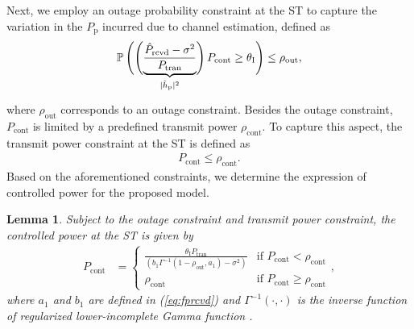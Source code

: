 \documentclass[letterpaper, twocolumn]{IEEEtran}
\newcommand{\p}{\mathbb P}
\newcommand{\sub}[1]{_{\text{#1}}}
\newcommand{\opc}{\rho\sub{out}}
\newcommand{\pc}{\rho\sub{cont}}
\newcommand{\preg}{P\sub{cont}}
\newcommand{\prcvd}{P\sub{rcvd}}
\newcommand{\eprcvd}{\hat{P}\sub{rcvd}}
\newcommand{\ptran}{P\sub{tran}}
\newcommand{\pp}{P\sub{p}}
\newcommand{\ite}{\theta\sub{I}}
\newcommand{\rs}{R\sub{s}}
\newcommand{\gp}{h\sub{p}}
\newcommand{\epgp}{|\hat{h}\sub{p}|^2}
\newcommand{\gs}{h\sub{s}}
\newcommand{\nps}{\sigma^2}
\newtheorem{lemma}{Lemma}
\begin{document}
Next, we employ an outage probability constraint at the ST to capture the variation in the $\pp$ incurred due to channel estimation, defined as 
\begin{align}
\p\left( \left( \smash[b]{\underbrace{\frac{\eprcvd - \nps}{\ptran}}_{\epgp}} \right) \preg \ge \ite \right) \le \opc, \label{eq:opc} \\[0.1em] \nonumber 
\end{align}
where $\opc$ corresponds to an outage constraint. 
Besides the outage constraint, $\preg$ is limited by a predefined transmit power $\pc$. To capture this aspect, the transmit power constraint at the ST is defined as
\begin{align}
\preg \le \pc. \label{eq:pc} 
\end{align} 
Based on the aforementioned constraints, we determine the expression of controlled power for the proposed model.
\begin{lemma} \label{lm:lm3}
Subject to the outage constraint and transmit power constraint, the controlled power at the ST is given by
\begin{align}
\preg &= 
\begin{cases} 
\frac{\ite \ptran}{ \left(b_1 \Gamma^{-1}(1-\opc, a_1) - \nps  \right)} & \mbox{if } \preg < \pc \\
\pc & \mbox{if } \preg \ge \pc
\end{cases},
\label{eq:preg} 
\end{align}
where $a_1$ and $b_1$ are defined in (\ref{eq:fprcvd}) and $\Gamma^{-1}(\cdot, \cdot)$ is the inverse function of regularized lower-incomplete Gamma function \cite{abramo}.
\end{lemma} 
\end{document}
